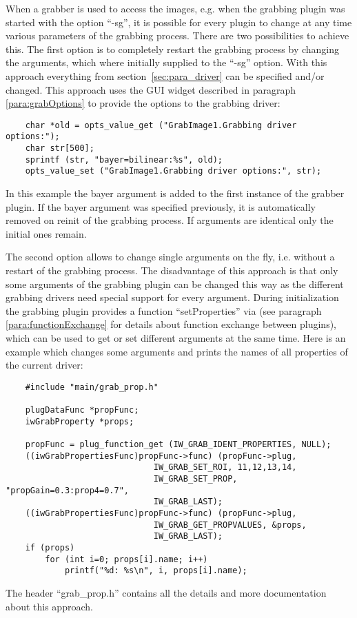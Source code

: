 When a grabber is used to access the images, e.g. when the grabbing
plugin was started with the option ``-sg'', it is possible for every
plugin to change at any time various parameters of the grabbing
process. There are two possibilities to achieve this. The first
option is to completely restart the grabbing process by changing the
arguments, which where initially supplied to the ``-sg''
option. With this approach everything from
section~\ref{sec:para_driver} can be specified and/or changed. This
approach uses the GUI widget described in paragraph
\ref{para:grabOptions} to provide the options to the grabbing
driver:
\begin{small}
\linespread{0.9}
\begin{verbatim}
    char *old = opts_value_get ("GrabImage1.Grabbing driver options:");
    char str[500];
    sprintf (str, "bayer=bilinear:%s", old);
    opts_value_set ("GrabImage1.Grabbing driver options:", str);
\end{verbatim}
\end{small}
In this example the bayer argument is added to the first instance of
the grabber plugin. If the bayer argument was specified previously,
it is automatically removed on reinit of the grabbing process. If
arguments are identical only the initial ones remain.

The second option allows to change single arguments on the fly,
i.e. without a restart of the grabbing process. The disadvantage of
this approach is that only some arguments of the grabbing plugin
can be changed this way as the different grabbing drivers need
special support for every argument. During initialization the
grabbing plugin provides a function ``setProperties'' via
 (see paragraph
\ref{para:functionExchange} for details about function exchange
between plugins), which can be used to get or set different
arguments at the same time. Here is an example which changes some
arguments and prints the names of all properties of the current
driver:
\begin{small}
\linespread{0.9}
\begin{verbatim}
    #include "main/grab_prop.h"

    plugDataFunc *propFunc;
    iwGrabProperty *props;

    propFunc = plug_function_get (IW_GRAB_IDENT_PROPERTIES, NULL);
    ((iwGrabPropertiesFunc)propFunc->func) (propFunc->plug,
                              IW_GRAB_SET_ROI, 11,12,13,14,
                              IW_GRAB_SET_PROP, "propGain=0.3:prop4=0.7",
                              IW_GRAB_LAST);
    ((iwGrabPropertiesFunc)propFunc->func) (propFunc->plug,
                              IW_GRAB_GET_PROPVALUES, &props,
                              IW_GRAB_LAST);
    if (props)
        for (int i=0; props[i].name; i++)
            printf("%d: %s\n", i, props[i].name);
\end{verbatim}
\end{small}
The header ``grab\_prop.h'' contains all the details and more
documentation about this approach.


